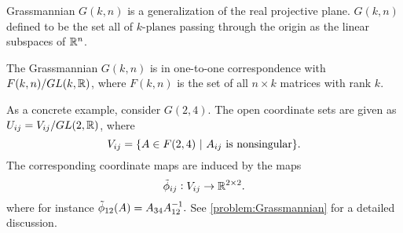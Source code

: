 \begin{summary}[Grassmannian]
	Grassmannian $ G(k,n) $ is a generalization of the real projective plane. $ G(k,n) $ defined to be the set all of $ k\text{-planes} $ passing through the origin as the linear subspaces of $ \mathbb{R}^n $.
	
	The Grassmannian $ G(k,n) $ is in one-to-one correspondence with $ F(k,n)/GL(k,\mathbb{R}) $, where $ F(k,n) $ is the set of all $ n\times k $ matrices with rank $ k $. 
	
	As a concrete example, consider $ G(2,4) $. The open coordinate sets are given as $ U_{ij} = V_{ij} / GL(2,\mathbb{R}) $, where
	\[ V_{ij} = \{A \in F(2,4) \ |\ A_{ij} \text{ is nonsingular}\}. \]
	The corresponding coordinate maps are induced by the maps
	\[ \tilde{\phi}_{ij} : V_{ij} \to \mathbb{R}^{2\times 2}. \]
	where for instance
	$ \tilde{\phi}_{12}(A) = A_{34}A^{-1}_{12}. $
	See \autoref{problem:Grassmannian} for a detailed discussion.
\end{summary}

\newpage

